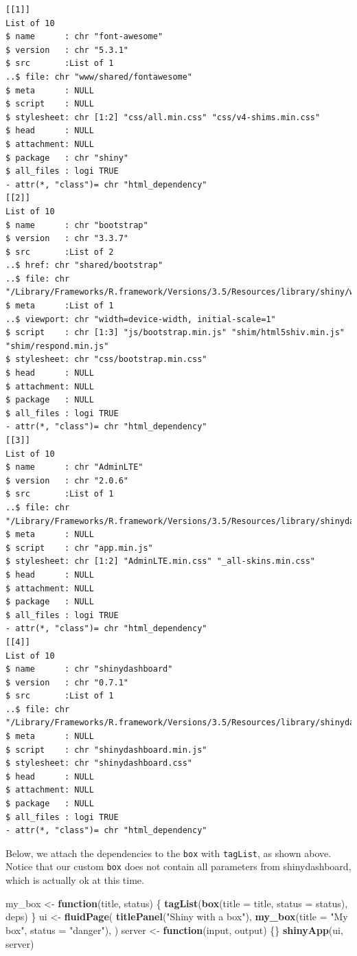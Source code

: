 \documentclass[
]{book}
\newenvironment{Shaded}{\begin{snugshade}}{\end{snugshade}}
\newcommand{\ControlFlowTok}[1]{\textcolor[rgb]{0.13,0.29,0.53}{\textbf{#1}}}
\newcommand{\DataTypeTok}[1]{\textcolor[rgb]{0.13,0.29,0.53}{#1}}
\newcommand{\KeywordTok}[1]{\textcolor[rgb]{0.13,0.29,0.53}{\textbf{#1}}}
\newcommand{\NormalTok}[1]{#1}
\newcommand{\StringTok}[1]{\textcolor[rgb]{0.31,0.60,0.02}{#1}}
\begin{document}
\begin{verbatim}
[[1]]
List of 10
$ name      : chr "font-awesome"
$ version   : chr "5.3.1"
$ src       :List of 1
..$ file: chr "www/shared/fontawesome"
$ meta      : NULL
$ script    : NULL
$ stylesheet: chr [1:2] "css/all.min.css" "css/v4-shims.min.css"
$ head      : NULL
$ attachment: NULL
$ package   : chr "shiny"
$ all_files : logi TRUE
- attr(*, "class")= chr "html_dependency"
[[2]]
List of 10
$ name      : chr "bootstrap"
$ version   : chr "3.3.7"
$ src       :List of 2
..$ href: chr "shared/bootstrap"
..$ file: chr "/Library/Frameworks/R.framework/Versions/3.5/Resources/library/shiny/www/shared/bootstrap"
$ meta      :List of 1
..$ viewport: chr "width=device-width, initial-scale=1"
$ script    : chr [1:3] "js/bootstrap.min.js" "shim/html5shiv.min.js" "shim/respond.min.js"
$ stylesheet: chr "css/bootstrap.min.css"
$ head      : NULL
$ attachment: NULL
$ package   : NULL
$ all_files : logi TRUE
- attr(*, "class")= chr "html_dependency"
[[3]]
List of 10
$ name      : chr "AdminLTE"
$ version   : chr "2.0.6"
$ src       :List of 1
..$ file: chr "/Library/Frameworks/R.framework/Versions/3.5/Resources/library/shinydashboard/AdminLTE"
$ meta      : NULL
$ script    : chr "app.min.js"
$ stylesheet: chr [1:2] "AdminLTE.min.css" "_all-skins.min.css"
$ head      : NULL
$ attachment: NULL
$ package   : NULL
$ all_files : logi TRUE
- attr(*, "class")= chr "html_dependency"
[[4]]
List of 10
$ name      : chr "shinydashboard"
$ version   : chr "0.7.1"
$ src       :List of 1
..$ file: chr "/Library/Frameworks/R.framework/Versions/3.5/Resources/library/shinydashboard"
$ meta      : NULL
$ script    : chr "shinydashboard.min.js"
$ stylesheet: chr "shinydashboard.css"
$ head      : NULL
$ attachment: NULL
$ package   : NULL
$ all_files : logi TRUE
- attr(*, "class")= chr "html_dependency"
\end{verbatim}

Below, we attach the dependencies to the \texttt{box} with \texttt{tagList}, as shown above. Notice that our custom \texttt{box} does not contain all parameters from shinydashboard, which is actually ok at this time.

\begin{Shaded}
\begin{Highlighting}[]
\NormalTok{my_box <-}\StringTok{ }\ControlFlowTok{function}\NormalTok{(title, status) \{}
  \KeywordTok{tagList}\NormalTok{(}\KeywordTok{box}\NormalTok{(}\DataTypeTok{title =}\NormalTok{ title, }\DataTypeTok{status =}\NormalTok{ status), deps)}
\NormalTok{\}}
\NormalTok{ui <-}\StringTok{ }\KeywordTok{fluidPage}\NormalTok{(}
  \KeywordTok{titlePanel}\NormalTok{(}\StringTok{"Shiny with a box"}\NormalTok{),}
  \KeywordTok{my_box}\NormalTok{(}\DataTypeTok{title =} \StringTok{"My box"}\NormalTok{, }\DataTypeTok{status =} \StringTok{"danger"}\NormalTok{),}
\NormalTok{)}
\NormalTok{server <-}\StringTok{ }\ControlFlowTok{function}\NormalTok{(input, output) \{\}}
\KeywordTok{shinyApp}\NormalTok{(ui, server)}
\end{Highlighting}
\end{Shaded}
\end{document}
